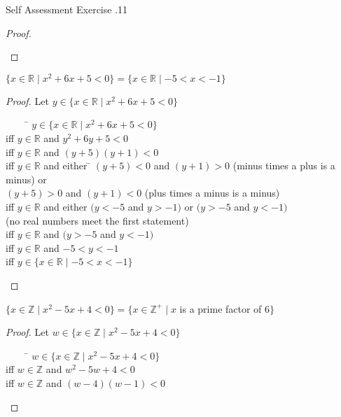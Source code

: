 \documentclass[\main/notes.tex]{subfiles}
\begin{document}
\begin{exercise}{Self Assessment Exercise \thechapter.11}
\begin{questions}
\begin{questions}
\begin{answer}
\begin{proof}
\begin{tabbing}
										\end{tabbing}
									\end{proof}
								\end{answer}
							\item $\{x \in \mathbb{R} \mid x^{2} + 6x + 5 < 0\} = \{x \in \mathbb{R} \mid -5 < x < -1\}$
								\begin{answer}
									\begin{proof}
										Let $y \in \{x \in \mathbb{R} \mid x^{2} + 6x + 5 < 0\}$
										\begin{tabbing}
											$\qquad$ \= $y \in \{x \in \mathbb{R} \mid x^{2} + 6x + 5 < 0\}$\\
											iff \> $y \in \mathbb{R}$ and $y^{2} + 6y + 5< 0$\\
											iff \> $y \in \mathbb{R}$ and $(y + 5)(y + 1) < 0$\\
											iff \> $y \in \mathbb{R}$ and either \= $(y + 5) < 0$ and $(y + 1) > 0$ (minus times a plus is a minus) or\\
											\> \> $(y + 5) > 0$ and $(y + 1) < 0$ (plus times a minus is a minus)\\
											iff \> $y \in \mathbb{R}$ and either $(y < -5$ and $y > -1)$ or $(y > -5$ and $y < -1)$\\
											\> \> (no real numbers meet the first statement)\\
											iff \> $y \in \mathbb{R}$ and $(y > -5$ and $y < -1)$\\
											iff \> $y \in \mathbb{R}$ and $-5 < y < -1$\\
											iff \> $y \in \{x \in \mathbb{R} \mid -5 < x < -1\}$
										\end{tabbing}
									\end{proof}
								\end{answer}
								\pagebreak
							\item $\{x \in \mathbb{Z} \mid x^{2} - 5x + 4 < 0\} = \{x \in \mathbb{Z}^{+} \mid x$ is a prime factor of $6\}$
								\begin{answer}
									\begin{proof}
										Let $w \in \{x \in \mathbb{Z} \mid x^{2} - 5x + 4 < 0\}$
										\begin{tabbing}
											$\qquad$ \= $w \in \{x \in \mathbb{Z} \mid x^{2} - 5x + 4 < 0\}$\\
											iff \> $w \in \mathbb{Z}$ and $w^{2} - 5w + 4 < 0$\\
											iff \> $w \in \mathbb{Z}$ and $(w - 4)(w - 1) < 0$\\

\end{tabbing}
\end{proof}
\end{answer}
\end{questions}
\end{questions}
\end{exercise}
\end{document}
